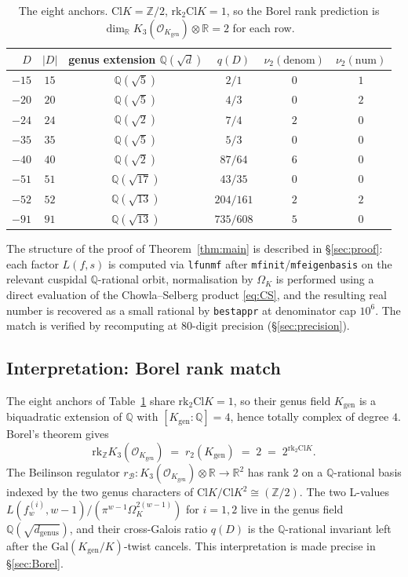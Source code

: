 \documentclass[11pt,a4paper]{amsart}
\theoremstyle{plain}
\theoremstyle{definition}
\newcommand{\Q}{\mathbb{Q}}
\newcommand{\Z}{\mathbb{Z}}
\newcommand{\R}{\mathbb{R}}
\newcommand{\Gal}{\mathrm{Gal}}
\newcommand{\Cl}{\mathrm{Cl}}
\newcommand{\rkk}{\mathrm{rk}}
\newcommand{\Kgen}{K_{\mathrm{gen}}}
\begin{document}
\begin{table}[h]
\centering
\caption{The eight anchors. $\Cl K = \Z/2$, $\rkk_2 \Cl K = 1$, so the
Borel rank prediction is $\dim_\R K_3(\mathcal{O}_\Kgen) \otimes \R = 2$ for each
row.}
\label{tab:8anchors}
\begin{tabular}{rccccc}
\toprule
$D$ & $|D|$ & genus extension $\Q(\sqrt{d})$
    & $q(D)$ & $\nu_2(\text{denom})$ & $\nu_2(\text{num})$\\
\midrule
$-15$ & $15$ & $\Q(\sqrt{5})$ & $2/1$            & $0$ & $1$\\
$-20$ & $20$ & $\Q(\sqrt{5})$ & $4/3$            & $0$ & $2$\\
$-24$ & $24$ & $\Q(\sqrt{2})$ & $7/4$            & $2$ & $0$\\
$-35$ & $35$ & $\Q(\sqrt{5})$ & $5/3$            & $0$ & $0$\\
$-40$ & $40$ & $\Q(\sqrt{2})$ & $87/64$          & $6$ & $0$\\
$-51$ & $51$ & $\Q(\sqrt{17})$& $43/35$          & $0$ & $0$\\
$-52$ & $52$ & $\Q(\sqrt{13})$& $204/161$        & $2$ & $2$\\
$-91$ & $91$ & $\Q(\sqrt{13})$& $735/608$        & $5$ & $0$\\
\bottomrule
\end{tabular}
\end{table}

The structure of the proof of Theorem~\ref{thm:main} is described in
\S\ref{sec:proof}: each factor $L(f, s)$ is computed via
\texttt{lfunmf} after \texttt{mfinit}/\texttt{mfeigenbasis} on the
relevant cuspidal $\Q$-rational orbit, normalisation by $\Omega_K$ is
performed using a direct evaluation of the Chowla--Selberg product
\eqref{eq:CS}, and the resulting real number is recovered as a small
rational by \texttt{bestappr} at denominator cap $10^6$. The match is
verified by recomputing at $80$-digit precision (\S\ref{sec:precision}).

\subsection{Interpretation: Borel rank match}

The eight anchors of Table~\ref{tab:8anchors} share $\rkk_2 \Cl K = 1$, so
their genus field $\Kgen$ is a biquadratic extension of $\Q$ with
$[\Kgen : \Q] = 4$, hence totally complex of degree $4$. Borel's theorem
\cite{Borel1974} gives
\begin{equation}\label{eq:Borel-rank}
  \rkk_\Z K_3(\mathcal{O}_\Kgen) \;=\; r_2(\Kgen) \;=\; 2 \;=\; 2^{\rkk_2 \Cl K}.
\end{equation}
The Beilinson regulator
$r_\mathcal{B} : K_3(\mathcal{O}_\Kgen) \otimes \R \to \R^2$ has rank $2$
on a $\Q$-rational basis indexed by the two genus characters of
$\Cl K / \Cl K^2 \cong (\Z/2)$. The two L-values
$L(f_w^{(i)}, w-1)/(\pi^{w-1} \Omega_K^{2(w-1)})$ for $i = 1, 2$ live in
the genus field $\Q(\sqrt{d_{\mathrm{genus}}})$, and their cross-Galois
ratio $q(D)$ is the $\Q$-rational invariant left after the
$\Gal(\Kgen/K)$-twist cancels. This interpretation is made precise in
\S\ref{sec:Borel}.
\end{document}
